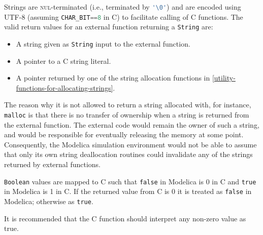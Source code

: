 Strings are \textsc{nul}-terminated (i.e., terminated by {\lstinline[language=C]!'\0'!}) and are encoded using UTF-8 (assuming {\lstinline[language=C]!CHAR_BIT==8!} in C) to facilitate calling of C functions.
The valid return values for an external function returning a {\lstinline!String!} are:
\begin{itemize}
\item A string given as {\lstinline!String!} input to the external function.
\item A pointer to a C string literal.
\item A pointer returned by one of the string allocation functions in \cref{utility-functions-for-allocating-strings}.
\end{itemize}

\begin{nonnormative}
The reason why it is not allowed to return a string allocated with, for instance, {\lstinline[language=C]!malloc!} is that there is no transfer of ownership when a string is returned from the external function.
The external code would remain the owner of such a string, and would be responsible for eventually releasing the memory at some point.
Consequently, the Modelica simulation environment would not be able to assume that only its own string deallocation routines could invalidate any of the strings returned by external functions.
\end{nonnormative}

{\lstinline!Boolean!} values are mapped to C such that {\lstinline!false!} in Modelica is 0 in C and {\lstinline!true!} in Modelica is 1 in C.
If the returned value from C is 0 it is treated as {\lstinline!false!} in Modelica; otherwise as {\lstinline!true!}.

\begin{nonnormative}
It is recommended that the C function should interpret any non-zero value as true.
\end{nonnormative}

